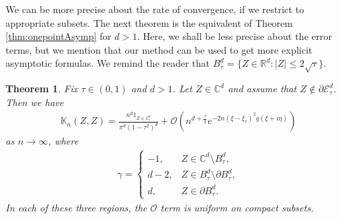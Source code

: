 \documentclass[%
 jmp,
cp,  %
 amsmath,amsthm,amssymb,%
 reprint,%
onecolumn]{revtex4-2}
\newtheorem{theorem}{Theorem}[section]
\begin{document}
 

        
We can be more precise about the rate of convergence, if we restrict to appropriate subsets. The next theorem is the equivalent of Theorem \ref{thm:onepointAsymp} for $d>1$. Here, we shall be less precise about the error terms, but we mention that our method can be used to get more explicit asymptotic formulas. We remind the reader that $
B_\tau^d = \{Z\in \mathbb R^d : \lvert Z\rvert \leq 2\sqrt \tau\}
$. 

\begin{theorem} \label{thm:onepointAsympd}
Fix $\tau\in (0,1)$ and $d>1$. Let $Z\in \mathbb C^d$ and assume that $Z\not\in \partial \mathcal E_\tau^d$. Then we have
\begin{align} \label{eq:onepointAsympd}
\mathbb K_n(Z, Z) = \frac{n^d \mathfrak{1}_{Z\in \mathcal E_\tau^d}}{\pi^d (1-\tau^2)^d} 
+ \mathcal O\left(n^{d+\frac{\gamma}{2}} e^{-2 n (\xi-\xi_\tau)^2 g(\xi+i\eta)}\right)
\end{align}
as $n\to\infty$, where
\begin{align*}
\gamma = 
\begin{cases}
-1, & Z\in \mathbb C^d\setminus B_\tau^d,\\
d-2, & Z\in B_\tau^d\setminus \partial B_\tau^d,\\
d, & Z\in \partial B_\tau^d.
\end{cases}
\end{align*} 
In each of these three regions, the $\mathcal O$ term is uniform on compact subsets.
\end{theorem}
\end{document}
